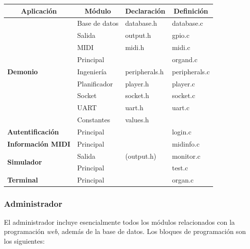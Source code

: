 \begin{center}
	\begin{tabular}{|l|l|l|l|}
		\hline \multicolumn{1}{|c|}{\textbf{Aplicación}} & \multicolumn{1}{c|}{\textbf{Módulo}} & \multicolumn{1}{c|}{\textbf{Declaración}} & \multicolumn{1}{c|}{\textbf{Definición}} \\ 
		\hline \multirow{9}{*}{\textbf{Demonio}} & Base de datos & database.h & database.c \\
		\cline{2-4} & Salida & output.h & gpio.c \\
		\cline{2-4} & MIDI & midi.h & midi.c \\
		\cline{2-4} & Principal & & organd.c \\
		\cline{2-4} & Ingeniería & peripherals.h & peripherals.c \\
		\cline{2-4} & Planificador & player.h & player.c \\
		\cline{2-4} & Socket & socket.h & socket.c \\
		\cline{2-4} & UART & uart.h & uart.c \\
		\cline{2-4} & Constantes & values.h & \\
		\hline \textbf{Autentificación} & Principal & & login.c \\
		\hline \textbf{Información MIDI} & Principal & & midinfo.c \\
		\hline \multirow{2}{*}{\textbf{Simulador}} & Salida & (output.h) & monitor.c \\
		\cline{2-4} & Principal & & test.c \\
		\hline \textbf{Terminal} & Principal & & organ.c \\
		\hline 
	\end{tabular}
	\smallskip
\end{center}

\smallskip

\subsubsection{Administrador}

El administrador incluye esencialmente todos los módulos relacionados con la programación \textit{web}, además de la base de datos. Los bloques de programación son los siguientes:

\smallskip

